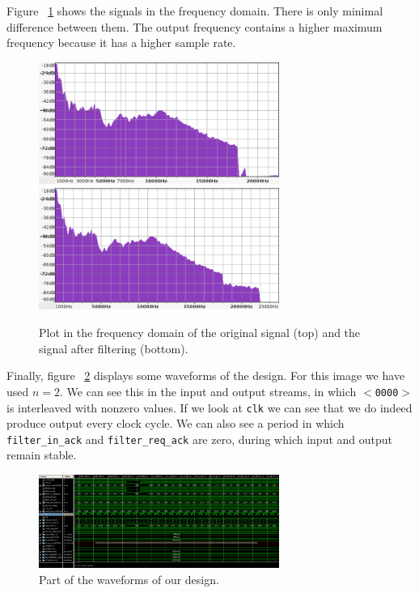\FloatBarrier
Figure ~\ref{fig:spectrum} shows the signals in the frequency domain. There is only minimal difference between them. The output frequency contains a higher maximum frequency because it has a higher sample rate. 
\begin{figure}
\begin{center}
\includegraphics[width=0.7\textwidth]{images/freq1.png}
\includegraphics[width=0.7\textwidth]{images/freq2.png}
\caption{Plot in the frequency domain of the original signal (top) and the signal after filtering (bottom).}
\label{fig:spectrum}
\end{center}
\end{figure}
Finally, figure ~\ref{fig:wave} displays some waveforms of the design. For this image we have used $n = 2$. We can see this in the input and output streams, in which \texttt{$<$0000$>$} is interleaved with nonzero values. If we look at \texttt{clk} we can see that we do indeed produce output every clock cycle. We can also see a period in which \texttt{filter\_in\_ack} and \texttt{filter\_req\_ack} are zero, during which input and output remain stable.
\begin{figure}
\begin{center}
\includegraphics[width=0.7\textwidth]{images/waveforms.png}
\caption{Part of the waveforms of our design.}
\label{fig:wave}
\end{center}
\end{figure}
\FloatBarrier

